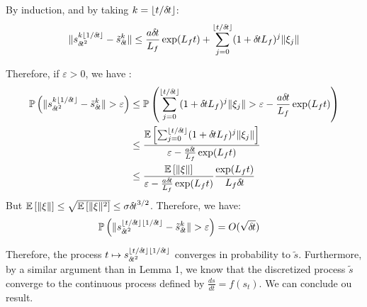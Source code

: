 By induction, and by taking $k = \lfloor t/{\delta\hspace{-.1em}t}\rfloor$:
\begin{align}
  \|s_{{\delta\hspace{-.1em}t}^2}^{k\lfloor 1/{\delta\hspace{-.1em}t}\rfloor}  - \tilde{s}_{\delta\hspace{-.1em}t}^{k}\| \leq \frac{a{\delta\hspace{-.1em}t}}{L_f}\exp(L_ft) + \sum_{j=0}^{\lfloor t/{\delta\hspace{-.1em}t} \rfloor}(1+{\delta\hspace{-.1em}t} L_f)^j\|\xi_j\|  
\end{align}

Therefore, if $\varepsilon >0$, we have :
\begin{align}
  \mathbb{P}\left(\|s_{{\delta\hspace{-.1em}t}^2}^{k\lfloor 1/{\delta\hspace{-.1em}t}\rfloor}  - \tilde{s}_{\delta\hspace{-.1em}t}^{k}\| > \varepsilon \right) &\leq \mathbb{P}\left(\sum_{j=0}^{\lfloor t/{\delta\hspace{-.1em}t} \rfloor}(1+{\delta\hspace{-.1em}t} L_f)^j\|\xi_j\| > \varepsilon - \frac{a{\delta\hspace{-.1em}t}}{L_f}\exp(L_ft)\right) \\
                                                                                            &\leq \frac{\mathbb{E}\left[\sum_{j=0}^{\lfloor t/{\delta\hspace{-.1em}t} \rfloor}(1+{\delta\hspace{-.1em}t} L_f)^j\|\xi_j\|\right]}{\varepsilon - \frac{a{\delta\hspace{-.1em}t}}{L_f}\exp(L_ft)}\\
                                                                                            &\leq \frac{\mathbb{E}\left[\|\xi\|\right]}{\varepsilon - \frac{a{\delta\hspace{-.1em}t}}{L_f}\exp(L_ft)}\frac{\exp(L_ft)}{L_f{\delta\hspace{-.1em}t}}\\
\end{align}
But $\mathbb{E}\left[\|\xi\|\right] \leq \sqrt{\mathbb{E}\left[\|\xi\|^2\right]} \leq \sigma {\delta\hspace{-.1em}t}^{3/2}$. Therefore, we have:
\begin{align}
  \mathbb{P}\left(\|s_{{\delta\hspace{-.1em}t}^2}^{\lfloor t/{\delta\hspace{-.1em}t}\rfloor\lfloor 1/{\delta\hspace{-.1em}t}\rfloor}  - \tilde{s}_{\delta\hspace{-.1em}t}^{k}\| > \varepsilon \right) & = O(\sqrt {{\delta\hspace{-.1em}t}})
\end{align}

Therefore, the  process $t \mapsto s_{{\delta\hspace{-.1em}t}^2}^{\lfloor t/{\delta\hspace{-.1em}t}\rfloor\lfloor 1/{\delta\hspace{-.1em}t}\rfloor}$ converges in probability to $\tilde s$. Furthermore, by a similar argument than in Lemma 1, we know that the discretized process $\tilde s$ converge to the continuous process defined by $\frac{ds}{dt} = f(s_t)$. We can conclude ou result.

